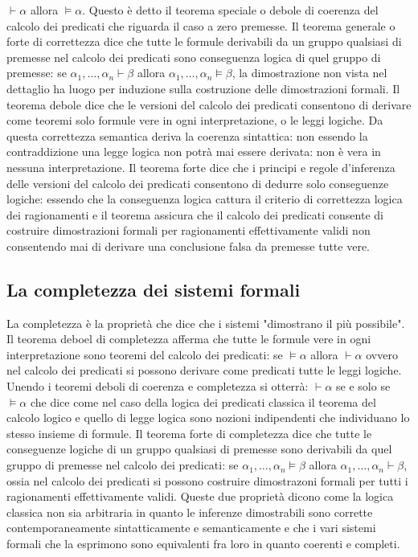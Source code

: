 $\vdash\alpha$ allora $\models\alpha$. Questo \`e detto il teorema speciale o debole di coerenza del calcolo dei predicati che riguarda il caso a zero 
premesse. Il teorema generale o forte di correttezza dice che tutte le formule derivabili da un gruppo qualsiasi di premesse nel calcolo dei predicati sono 
conseguenza logica di quel gruppo di premesse: se $\alpha_1, \dots, \alpha_n\vdash\beta$ allora $\alpha_1,\dots, \alpha_n\models\beta$, la dimostrazione non
vista nel dettaglio ha luogo per induzione sulla costruzione delle dimostrazioni formali. Il teorema debole dice che le versioni del calcolo dei predicati 
consentono di derivare come teoremi solo formule vere in ogni interpretazione, o le leggi logiche. Da questa correttezza semantica deriva la coerenza 
sintattica: non essendo la contraddizione una legge logica non potr\`a mai essere derivata: non \`e vera in nessuna interpretazione. Il teorema forte dice 
che i principi e regole d'inferenza delle versioni del calcolo dei predicati consentono di dedurre solo conseguenze logiche: essendo che la conseguenza
logica cattura il criterio di correttezza logica dei ragionamenti e il teorema assicura che il calcolo dei predicati consente di costruire dimostrazioni
formali per ragionamenti effettivamente validi non consentendo mai di derivare una conclusione falsa da premesse tutte vere.
\subsection{La completezza dei sistemi formali}
La completezza \`e la propriet\`a che dice che i sistemi "dimostrano il pi\`u possibile". Il teorema deboel di completezza afferma che tutte le formule vere 
in ogni interpretazione sono teoremi del calcolo dei predicati: se $\models\alpha$ allora $\vdash\alpha$ ovvero nel calcolo dei predicati si possono 
derivare come predicati tutte le leggi logiche. Unendo i teoremi deboli di coerenza e completezza si otterr\`a: $\vdash\alpha$ se e solo se $\models\alpha$ 
che dice come nel caso della logica dei predicati classica il teorema del calcolo logico e quello di legge logica sono nozioni indipendenti che individuano
lo stesso insieme di formule. Il teorema forte di completezza dice che tutte le conseguenze logiche di un gruppo qualsiasi di premesse sono derivabili da 
quel gruppo di premesse nel calcolo dei predicati: se $\alpha_1, \dots, \alpha_n\models\beta$ allora $\alpha_1,\dots, \alpha_n\vdash\beta$, ossia nel calcolo
dei predicati si possono costruire dimostrazoni formali per tutti i ragionamenti effettivamente validi. Queste due propriet\`a dicono come la logica classica
non sia arbitraria in quanto le inferenze dimostrabili sono corrette contemporaneamente sintatticamente e semanticamente e che i vari sistemi formali che
la esprimono sono equivalenti fra loro in quanto coerenti e completi. 
